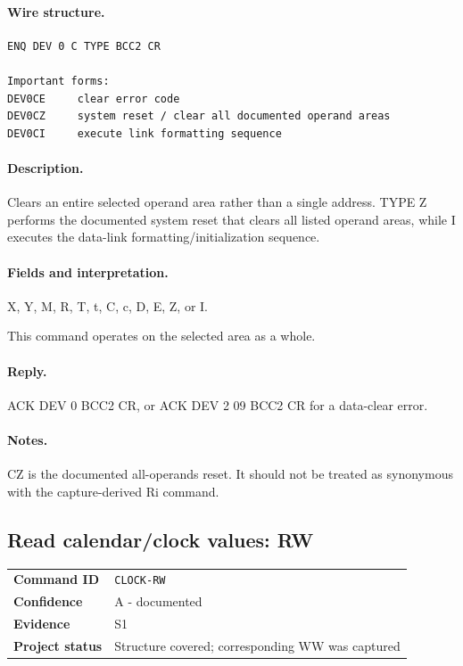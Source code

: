 \documentclass[10pt,letterpaper]{article}
\begin{document}
\paragraph{Wire structure.}
\begin{Verbatim}[breaklines=true,breakanywhere=true,fontsize=\small]
ENQ DEV 0 C TYPE BCC2 CR

Important forms:
DEV0CE     clear error code
DEV0CZ     system reset / clear all documented operand areas
DEV0CI     execute link formatting sequence
\end{Verbatim}
\paragraph{Description.} Clears an entire selected operand area rather than a single address. TYPE Z performs the documented system reset that clears all listed operand areas, while I executes the data-link formatting/initialization sequence.
\paragraph{Fields and interpretation.}
\begin{description}[style=nextline,leftmargin=3.2cm,labelwidth=3.0cm,font=\normalfont\bfseries]
\item[TYPE] X, Y, M, R, T, t, C, c, D, E, Z, or I.
\item[No address] This command operates on the selected area as a whole.
\end{description}
\paragraph{Reply.} ACK DEV 0 BCC2 CR, or ACK DEV 2 09 BCC2 CR for a data-clear error.
\paragraph{Notes.} CZ is the documented all-operands reset. It should not be treated as synonymous with the capture-derived Ri command.

\subsection{Read calendar/clock values: RW}
\begin{tabularx}{\textwidth}{@{}>{\bfseries}p{2.8cm}X@{}}
Command ID & \texttt{CLOCK-RW} \\
Confidence & A - documented \\
Evidence & S1 \\
Project status & Structure covered; corresponding WW was captured \\
\end{tabularx}
\vspace{0.35em}
\end{document}

